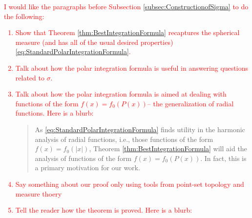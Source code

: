 \documentclass[11pt]{article}
\begin{document}
\textcolor{red}{ I would like the paragraphs before Subsection \ref{subsec:ConstructionofSigma} to do the following:
\begin{enumerate}
    \item Show that Theorem \ref{thm:BestIntegrationFormula} recaptures the spherical measure (and has all of the usual desired properties) \eqref{eq:StandardPolarIntegrationFormula}.
    \item Talk about how the polar integration formula is useful in answering questions related to $\sigma$.
    \item Talk about how the polar integration formula is aimed at dealing with functions of the form $f(x)=f_0(P(x))$-- the generalization of radial functions. Here is a blurb:
    \begin{quote}
     As \eqref{eq:StandardPolarIntegrationFormula} finds utility in the harmonic analysis of radial functions, i.e., those functions of the form $f(x)=f_0(|x|)$, Theorem \ref{thm:BestIntegrationFormula} will aid the analysis of functions of the form $f(x)=f_0(P(x))$. In fact, this is a primary motivation for our work.
    \end{quote}
    \item Say something about our proof only using tools from point-set topology and measure thoery
    \item Tell the reader how the theorem is proved. Here is a blurb:
    \begin{quote}

\end{quote}
\end{enumerate}}
\end{document}

